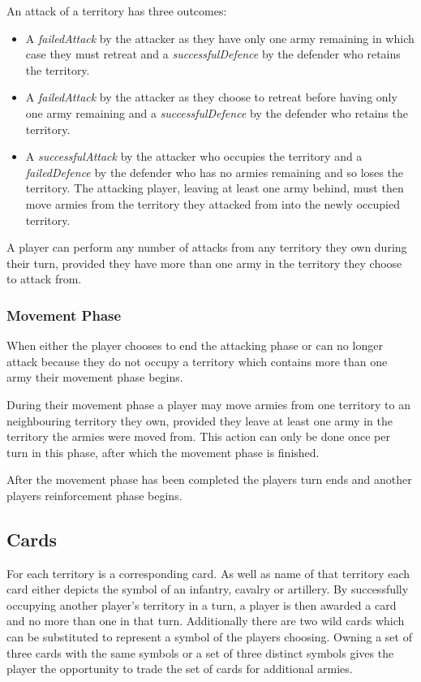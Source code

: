 \documentclass[parskip]{cs4rep}
\begin{document}
An attack of a territory has three outcomes:

\begin{itemize}
\item
A \textit{failedAttack} by the attacker as they have only one army remaining in which case they must retreat and a \textit{successfulDefence} by the defender who retains the territory.
\item
A \textit{failedAttack} by the attacker as they choose to retreat before having only one army remaining and a \textit{successfulDefence} by the defender who retains the territory.
\item
A \textit{successfulAttack} by the attacker who occupies the territory and a \textit{failedDefence} by the defender who has no armies remaining and so loses the territory. The attacking player, leaving at least one army behind, must then move armies from the territory they attacked from into the newly occupied territory.
\end{itemize}

A player can perform any number of attacks from any territory they own during their turn, provided they have more than one army in the territory they choose to attack from.

\subsubsection{Movement Phase}

When either the player chooses to end the attacking phase or can no longer attack because they do not occupy a territory which contains more than one army their movement phase begins.

During their movement phase a player may move armies from one territory to an neighbouring territory they own, provided they leave at least one army in the territory the armies were moved from. This action can only be done once per turn in this phase, after which the movement phase is finished.

After the movement phase has been completed the players turn ends and another players reinforcement phase begins.
\newpage

\subsection{Cards}

For each territory is a corresponding card. As well as name of that territory each card either depicts the symbol of an infantry, cavalry or artillery. By successfully occupying another player's territory in a turn, a player is then awarded a card and no more than one in that turn. Additionally there are two wild cards which can be substituted to represent a symbol of the players choosing. Owning a set of three cards with the same symbols or a set of three distinct symbols gives the player the opportunity to trade the set of cards for additional armies.
\end{document}
